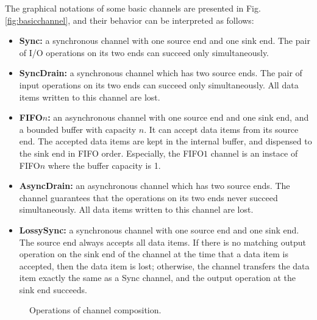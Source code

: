 \documentclass[3p,times]{elsarticle}
\begin{document}
The graphical notations of some basic channels are presented in Fig. \ref{fig:basicchannel}, and their behavior can be interpreted as follows:
\begin{itemize}
\item{\textbf{Sync:} a synchronous channel with one source end and one sink end. The pair of I/O operations on its two ends can succeed only simultaneously.}
\item{\textbf{SyncDrain:} a synchronous channel which has two source ends.
 The pair of input operations on its two ends can succeed only simultaneously.
 All data items written to this channel are lost.}
\item{\textbf{FIFO$n$:} an asynchronous channel with one source end and one sink end, and a bounded buffer with capacity $n$.
It can accept data items from its source end. The accepted data items are kept in the internal buffer, and dispensed to
the sink end in FIFO order.
Especially, the FIFO$1$ channel is an instace of FIFO$n$ where the buffer capacity is 1.}
\item{\textbf{AsyncDrain:}  an asynchronous channel} which has two source ends. The channel guarantees that the operations on its two ends never succeed simultaneously. All data items written to this channel are lost.
\item{\textbf{LossySync:} a synchronous channel with one source end
    and one sink end. The source end always accepts all data items. If
    there is no matching output operation on the sink end of the
    channel at the time that a data item is accepted, then the data
    item is lost; otherwise, the channel transfers the data item
    exactly the same as a Sync channel, and the output operation at the sink end succeeds.}
\end{itemize}

\begin{figure}
\centering
{}
\caption{Operations of channel composition.}\label{fig:channelcomposition}
\end{figure}
\end{document}
